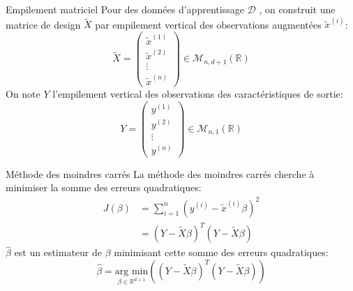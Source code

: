 \documentclass[10pt]{beamer}  %
\begin{document}
\begin{frame}{Empilement matriciel}
	Pour des données d'apprentissage $\mathcal{D}$ , on construit une matrice de design $\tilde{X}$ par empilement vertical des observations augmentées $\tilde{x}^{(i)}$:
	\begin{equation}
		\tilde{X} = \begin{pmatrix}\tilde{x}^{(1)} \\ \tilde{x}^{(2)} \\ \vdots \\ \tilde{x}^{(n)} \end{pmatrix} \in \mathcal{M}_{n, d+1}(\mathbb{R})
		\nonumber
	\end{equation}
	On note $Y$ l'empilement vertical des observations des caractéristiques de sortie:
	\begin{equation}
		Y = \begin{pmatrix}y^{(1)} \\ y^{(2)} \\ \vdots \\ y^{(n)} \end{pmatrix} \in \mathcal{M}_{n, 1}(\mathbb{R})
		\nonumber
	\end{equation}	
\end{frame}

\begin{frame}{Méthode des moindres carrés}
	La méthode des moindres carrés cherche à minimiser la somme des erreurs quadratiques:
	\begin{equation}
		\begin{aligned}
			J(\beta) &= \sum_{i=1}^n \left(y^{(i)} - \tilde{x}^{(i)} \beta\right)^2 \\
			         &= \left(Y - \tilde{X} \beta\right)^T \left(Y - \tilde{X} \beta\right)
		\end{aligned}
		\nonumber
	\end{equation}
	$\hat{\beta}$ est un estimateur de $\beta$ minimisant cette somme des erreurs quadratiques:
	\begin{equation}
		\hat{\beta} = \underset{\beta \in \mathbb{R}^{d+1}}{\text{arg min}}\left(\left(Y - \tilde{X} \beta\right)^T \left(Y - \tilde{X} \beta\right)\right)
		\nonumber
	\end{equation}
\end{frame}
\end{document}
